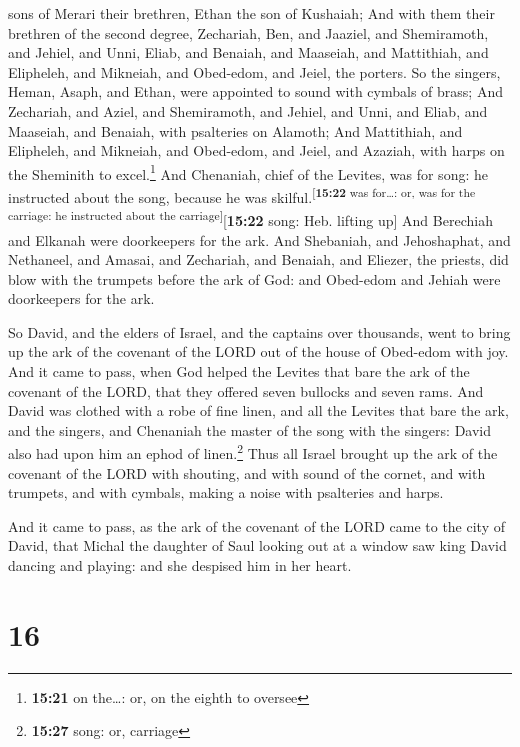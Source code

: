 sons of Merari their brethren, Ethan the son of Kushaiah;
 And with them their brethren of the second degree,
Zechariah, Ben, and Jaaziel, and Shemiramoth, and Jehiel, and Unni,
Eliab, and Benaiah, and Maaseiah, and Mattithiah, and Elipheleh, and
Mikneiah, and Obed-edom, and Jeiel, the porters.  So the
singers, Heman, Asaph, and Ethan, were appointed to sound with cymbals
of brass;  And Zechariah, and Aziel, and Shemiramoth, and
Jehiel, and Unni, and Eliab, and Maaseiah, and Benaiah, with psalteries
on Alamoth;  And Mattithiah, and Elipheleh, and Mikneiah,
and Obed-edom, and Jeiel, and Azaziah, with harps on the Sheminith to
excel.\footnote{\textbf{15:21} on the\ldots: or, on the eighth to
  oversee}  And Chenaniah, chief of the Levites, was for
song: he instructed about the song, because he was
skilful.\textsuperscript{{[}\textbf{15:22} was for\ldots: or, was for
the carriage: he instructed about the carriage{]}}{[}\textbf{15:22}
song: Heb. lifting up{]}  And Berechiah and Elkanah were
doorkeepers for the ark.  And Shebaniah, and Jehoshaphat,
and Nethaneel, and Amasai, and Zechariah, and Benaiah, and Eliezer, the
priests, did blow with the trumpets before the ark of God: and Obed-edom
and Jehiah were doorkeepers for the ark.

 So David, and the elders of Israel, and the captains
over thousands, went to bring up the ark of the covenant of the LORD out
of the house of Obed-edom with joy.  And it came to pass,
when God helped the Levites that bare the ark of the covenant of the
LORD, that they offered seven bullocks and seven rams. 
And David was clothed with a robe of fine linen, and all the Levites
that bare the ark, and the singers, and Chenaniah the master of the song
with the singers: David also had upon him an ephod of linen.\footnote{\textbf{15:27}
  song: or, carriage}  Thus all Israel brought up the ark
of the covenant of the LORD with shouting, and with sound of the cornet,
and with trumpets, and with cymbals, making a noise with psalteries and
harps.

 And it came to pass, as the ark of the covenant of the
LORD came to the city of David, that Michal the daughter of Saul looking
out at a window saw king David dancing and playing: and she despised him
in her heart.

\hypertarget{section-15}{%
\section{16}\label{section-15}}


